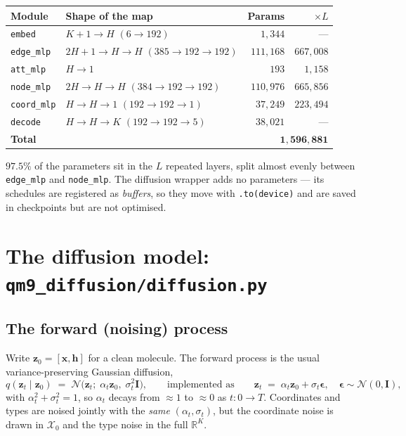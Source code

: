 \documentclass[11pt,a4paper]{article}
\newcommand{\code}[1]{\texttt{#1}}
\newcommand{\R}{\mathbb{R}}
\newcommand{\bx}{\mathbf{x}}
\newcommand{\bh}{\mathbf{h}}
\newcommand{\bz}{\mathbf{z}}
\newcommand{\bm}{\boldsymbol{\epsilon}}
\newcommand{\file}[1]{\textcolor{BlueLink}{\texttt{#1}}}
\begin{document}
\begin{center}
\begin{tabular}{@{}llrr@{}}
\toprule
\textbf{Module} & \textbf{Shape of the map} & \textbf{Params} & \textbf{$\times L$} \\
\midrule
\code{embed}     & $K{+}1 \to H$ \; $(6\to192)$              & $1{,}344$   & --- \\
\code{edge\_mlp} & $2H{+}1 \to H \to H$ \; $(385\to192\to192)$ & $111{,}168$ & $667{,}008$ \\
\code{att\_mlp}  & $H \to 1$                                  & $193$       & $1{,}158$ \\
\code{node\_mlp} & $2H \to H \to H$ \; $(384\to192\to192)$     & $110{,}976$ & $665{,}856$ \\
\code{coord\_mlp}& $H \to H \to 1$ \; $(192\to192\to1)$        & $37{,}249$  & $223{,}494$ \\
\code{decode}    & $H \to H \to K$ \; $(192\to192\to5)$        & $38{,}021$  & --- \\
\midrule
\textbf{Total}   &                                            & \multicolumn{2}{r}{$\mathbf{1{,}596{,}881}$} \\
\bottomrule
\end{tabular}
\end{center}

\noindent
$97.5\%$ of the parameters sit in the $L$ repeated layers, split almost evenly
between \code{edge\_mlp} and \code{node\_mlp}. The diffusion wrapper adds no
parameters --- its schedules are registered as \emph{buffers}, so they move with
\code{.to(device)} and are saved in checkpoints but are not optimised.

\section{The diffusion model: \file{qm9\_diffusion/diffusion.py}}

\subsection{The forward (noising) process}

Write $\bz_0=[\bx,\bh]$ for a clean molecule. The forward process is the usual
variance-preserving Gaussian diffusion,
\begin{equation}
  q(\bz_t \mid \bz_0) \;=\; \mathcal{N}\bigl(\bz_t;\;\alpha_t \bz_0,\;\sigma_t^2 \mathbf{I}\bigr),
  \qquad\text{implemented as}\qquad
  \bz_t \;=\; \alpha_t \bz_0 + \sigma_t \bm,\quad \bm\sim\mathcal{N}(0,\mathbf{I}),
\end{equation}
with $\alpha_t^2+\sigma_t^2=1$, so $\alpha_t$ decays from $\approx1$ to
$\approx0$ as $t: 0\to T$. Coordinates and types are noised jointly with the
\emph{same} $(\alpha_t,\sigma_t)$, but the coordinate noise is drawn in
$\mathcal{X}_0$ and the type noise in the full $\R^{K}$.
\end{document}
